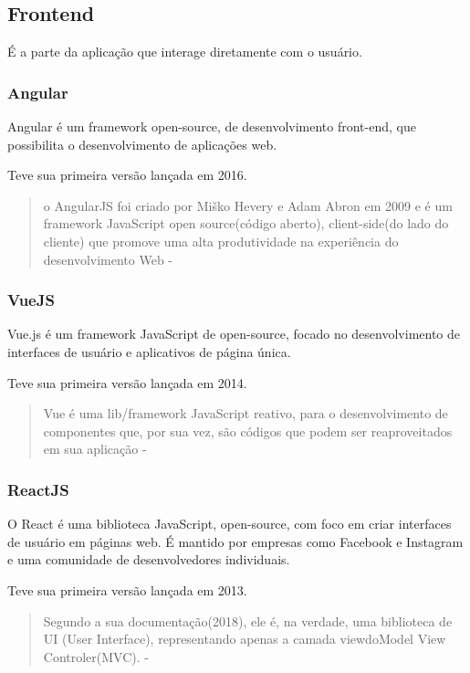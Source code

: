 \subsection{Frontend}

É a parte da aplicação que interage diretamente com o usuário.

\subsubsection{Angular}

Angular é um framework open-source, de desenvolvimento front-end, que possibilita o desenvolvimento de aplicações web.

Teve sua primeira versão lançada em 2016.

\begin{quote}
  o AngularJS foi criado por Miško Hevery e Adam Abron  em  2009  e  é  um  framework  JavaScript open  source(código  aberto), client-side(do lado  do  cliente)  que  promove  uma  alta  produtividade  na  experiência  do  desenvolvimento Web - \cite{ferreira2018analise}
\end{quote}


\subsubsection{VueJS}

Vue.js é um framework JavaScript de open-source, focado no desenvolvimento de interfaces de usuário e aplicativos de página única.

Teve sua primeira versão lançada em 2014.

\begin{quote}
  Vue é uma lib/framework JavaScript reativo, para  o  desenvolvimento  de  componentes  que,  por  sua  vez,  são  códigos  que  podem  ser reaproveitados em sua aplicação - \cite{ferreira2018analise}
\end{quote}


\subsubsection{ReactJS}

O React é uma biblioteca JavaScript, open-source, com foco em criar interfaces de usuário em páginas web. É mantido por empresas como Facebook e Instagram e uma comunidade de desenvolvedores individuais. 

Teve sua primeira versão lançada em 2013.

\begin{quote}
  Segundo a sua documentação(2018), ele é, na  verdade,  uma  biblioteca  de  UI  (User  Interface),  representando  apenas  a  camada viewdoModel  View  Controler(MVC).  - \cite{ferreira2018analise}
\end{quote}

